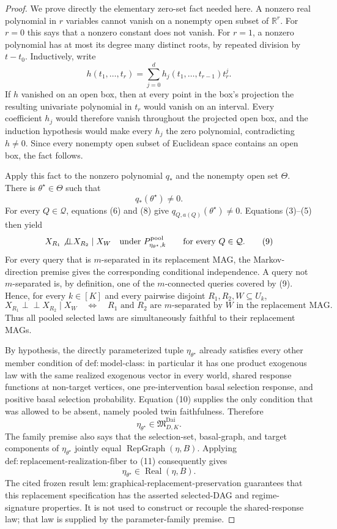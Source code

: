 \documentclass{article}
\begin{document}
\begin{proof}
We prove directly the elementary zero-set fact needed here.  A nonzero real polynomial in \(r\) variables cannot vanish on a nonempty open subset of \(\mathbb R^r\).  For \(r=0\) this says that a nonzero constant does not vanish.  For \(r=1\), a nonzero polynomial has at most its degree many distinct roots, by repeated division by \(t-t_0\).  Inductively, write
\[
 h(t_1,\ldots,t_r)=\sum_{j=0}^{d}h_j(t_1,\ldots,t_{r-1})t_r^j.
 \tag{7}
\]
If \(h\) vanished on an open box, then at every point in the box's projection the resulting univariate polynomial in \(t_r\) would vanish on an interval.  Every coefficient \(h_j\) would therefore vanish throughout the projected open box, and the induction hypothesis would make every \(h_j\) the zero polynomial, contradicting \(h\ne0\).  Since every nonempty open subset of Euclidean space contains an open box, the fact follows.

Apply this fact to the nonzero polynomial \(q_*\) and the nonempty open set \(\Theta\).  There is \(\theta^\star\in\Theta\) such that
\[
 q_*(\theta^\star)\ne0.
 \tag{8}
\]
For every \(Q\in\mathcal Q\), equations (6) and (8) give \(q_{Q,a(Q)}(\theta^\star)\ne0\).  Equations (3)--(5) then yield
\[
 X_{R_1}\not\!\mathbin{\perp\!\!\!\perp}X_{R_2}\mid X_W
 \quad\text{under }P_{\eta_{\theta^\star},k}^{\mathrm{pool}}
 \qquad\text{for every }Q\in\mathcal Q.
 \tag{9}
\]
For every query that is \(m\)-separated in its replacement MAG, the Markov-direction premise gives the corresponding conditional independence.  A query not \(m\)-separated is, by definition, one of the \(m\)-connected queries covered by (9).  Hence, for every \(k\in[K]\) and every pairwise disjoint \(R_1,R_2,W\subseteq U_k\),
\[
 X_{R_1}\mathbin{\perp\!\!\!\perp}X_{R_2}\mid X_W
 \quad\Longleftrightarrow\quad
 R_1\text{ and }R_2\text{ are }m\text{-separated by }W
 \text{ in the replacement MAG}.
 \tag{10}
\]
Thus all pooled selected laws are simultaneously faithful to their replacement MAGs.

By hypothesis, the directly parameterized tuple \(\eta_{\theta^\star}\) already satisfies every other member condition of \(\mathrm{def:model\mbox{-}class}\): in particular it has one product exogenous law with the same realized exogenous vector in every world, shared response functions at non-target vertices, one pre-intervention basal selection response, and positive basal selection probability.  Equation (10) supplies the only condition that was allowed to be absent, namely pooled twin faithfulness.  Therefore
\[
 \eta_{\theta^\star}\in\mathfrak M_{D,K}^{\mathrm{Dai}}.
 \tag{11}
\]
The family premise also says that the selection-set, basal-graph, and target components of \(\eta_{\theta^\star}\) jointly equal \(\operatorname{RepGraph}(\eta,B)\).  Applying \(\mathrm{def:replacement\mbox{-}realization\mbox{-}fiber}\) to (11) consequently gives
\[
 \eta_{\theta^\star}\in\operatorname{Real}(\eta,B).
 \tag{12}
\]
The cited frozen result \(\mathrm{lem:graphical\mbox{-}replacement\mbox{-}preservation}\) guarantees that this replacement specification has the asserted selected-DAG and regime-signature properties.  It is not used to construct or recouple the shared-response law; that law is supplied by the parameter-family premise.


\end{proof}
\end{document}
